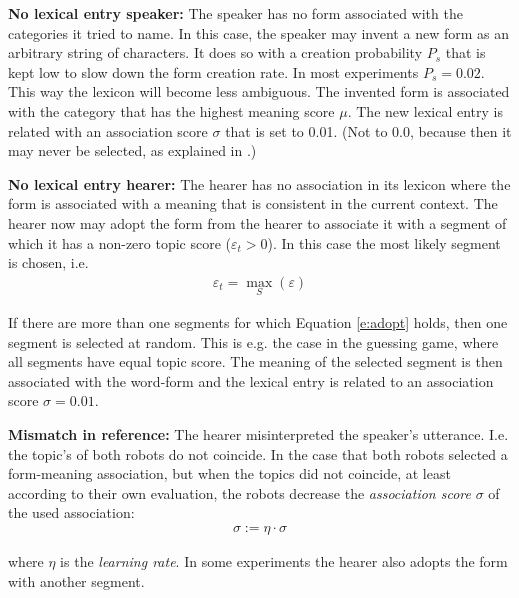 \begin{description}
\item {\bf No lexical entry speaker:} The speaker has no form associated with the categories it tried to name. In this case, the speaker may invent a new form as an arbitrary string of characters. It does so with a creation probability $P_s$ that is kept low to slow down the form creation rate. In most experiments $P_s=0.02$. This way the lexicon will become less ambiguous. The invented form is associated with the category that has the highest meaning score $\mu$. The new lexical entry is related with an association score $\sigma$ that is set to 0.01. (Not to 0.0, because then it may never be selected, as explained in .)

\item {\bf No lexical entry hearer:} The hearer has no association in its lexicon where the form is associated with a meaning that is consistent in the current context. The hearer now may adopt the form from the hearer to associate it with a segment of which it has a non-zero topic score ($\varepsilon_t>0$). In this case the most likely segment is chosen, i.e. 
\begin{eqnarray}
\varepsilon_t = \max_S (\varepsilon)
\label{e:adopt}
\end{eqnarray}

\noindent
If there are more than one segments for which Equation \ref{e:adopt} holds, then one segment is selected at random. This is e.g. the case in the guessing game, where all segments have equal topic score. The meaning of the selected segment is then associated with the word-form and the lexical entry is related to an association score $\sigma=0.01$.

\item {\bf Mismatch in reference:} The hearer misinterpreted the speaker's utterance. I.e. the topic's of both robots do not coincide. In the case that both robots selected a form-meaning association, but when the topics did not coincide, at least according to their own evaluation, the robots decrease the {\em association score} $\sigma$ of the used association:
\begin{eqnarray}
\sigma := \eta \cdot \sigma
\label{e:cm:adapt1}
\end{eqnarray}


where $\eta$ is the {\em learning rate}. In some experiments the hearer also adopts the form with another segment.


\end{description}
